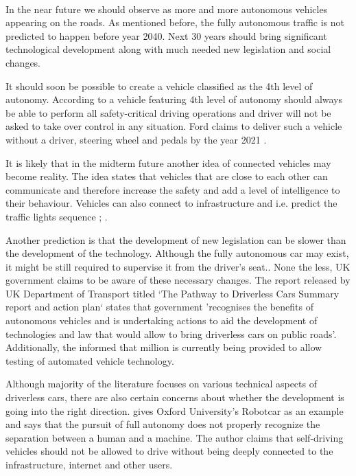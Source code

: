 \documentclass[11pt,english]{article}
\begin{document}
\paragraph{}
In the near future we should observe as more and more autonomous vehicles appearing on the roads. As mentioned before, the fully autonomous traffic is not predicted to happen before year 2040. Next 30 years should bring significant technological development along with much needed new legislation and social changes.
\par
It should soon be possible to create a vehicle classified as the 4th level of autonomy. According to \citet{nhtsa1} a vehicle featuring 4th level of autonomy should always be able to perform all safety-critical driving operations and driver will not be asked to take over control in any situation. Ford claims to deliver such a vehicle without a driver, steering wheel and pedals by the year 2021 \citep{ford1}.

\par


It is likely that in the midterm future another idea of connected vehicles may become reality. The idea states that vehicles that are close to each other can communicate and therefore increase the safety and add a level of intelligence to their behaviour. Vehicles can also connect to infrastructure and i.e. predict the traffic lights sequence \citep{narla2013evolution} ; \citep{luettel2012autonomous}.

\par
Another prediction is that the development of new legislation can be slower than the development of the technology. Although the fully autonomous car may exist, it might be still required to supervise it from the driver's seat.\citep{luettel2012autonomous}. None the less, UK government claims to be aware of these necessary changes. The report released by UK Department of Transport titled `The Pathway to Driverless Cars Summary report and action plan` \citep{pathwaytodriverless} states that government 'recognises the benefits of autonomous vehicles and is undertaking actions to aid the development of technologies and law that would allow to bring driverless cars on public roads'. Additionally, the \citet{pathwaytodriverless2} informed that  million is currently being provided  to allow testing of automated vehicle technology.

\par
Although majority of the literature focuses on various technical aspects of driverless cars, there are also certain concerns about whether the development is going into the right direction. \citet{mcbride2016ethics} gives Oxford University’s Robotcar as an example and  says that the pursuit of full autonomy does not properly recognize the separation between a human and a machine. The author claims that self-driving vehicles should not be allowed to drive without being deeply connected to the infrastructure, internet and other users.
\end{document}
